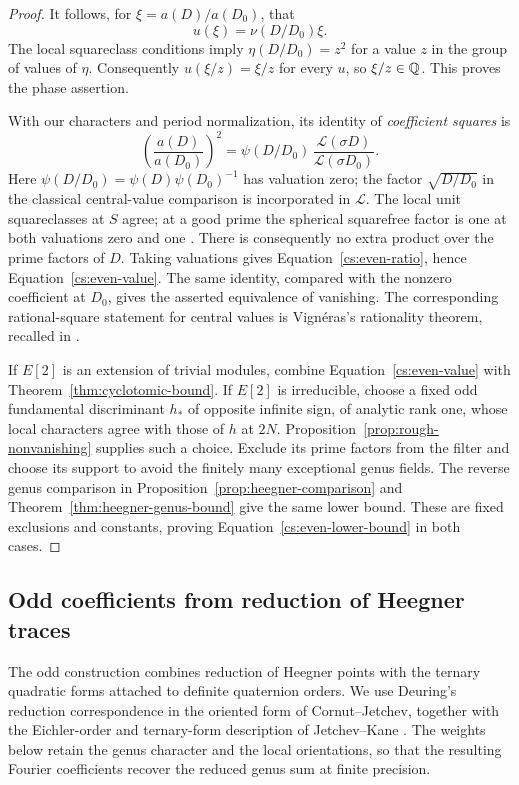 \begin{proof}
It follows, for $\xi=a(D)/a(D_0)$, that
\[
                         u(\xi)=\nu(D/D_0)\xi.
\]
The local squareclass conditions imply
$\eta(D/D_0)=z^2$ for a value $z$ in the group of values of $\eta$.
Consequently $u(\xi/z)=\xi/z$ for every $u$, so $\xi/z\in\mathbb Q$.
This proves the phase assertion.

With our characters and period normalization, its identity of
\emph{coefficient squares} is
\begin{equation}
 \left(\frac{a(D)}{a(D_0)}\right)^2
 =\psi(D/D_0)\,
   \frac{\mathcal L(\sigma D)}{\mathcal L(\sigma D_0)}.
 \label{cs:even-square-ratio}
\end{equation}
Here $\psi(D/D_0)=\psi(D)\psi(D_0)^{-1}$ has valuation zero;
the factor $\sqrt{D/D_0}$ in the classical central-value comparison
is incorporated in $\mathcal L$. The local unit
squareclasses at $S$ agree; at a good prime the spherical squarefree
factor is one at both valuations zero and one
\citep[Section~I.3, pp.~377--378]{Waldspurger1981}.
There is consequently no extra product over the prime factors of $D$.
Taking valuations gives Equation~\eqref{cs:even-ratio}, hence
Equation~\eqref{cs:even-value}. The same identity, compared with the
nonzero coefficient at $D_0$, gives the asserted equivalence of
vanishing. The corresponding rational-square statement for central values
is Vign\'eras's rationality theorem, recalled in
\citet[Section~6.3, Theorem~6]{Waldspurger1983}.

If $E[2]$ is an extension of trivial modules, combine
Equation~\eqref{cs:even-value} with
Theorem~\ref{thm:cyclotomic-bound}.
If $E[2]$ is irreducible, choose a fixed odd fundamental discriminant
$h_*$ of opposite infinite sign, of analytic rank one, whose local
characters agree with those of $h$ at $2N$.  Proposition~\ref{prop:rough-nonvanishing}
supplies such a choice.  Exclude its prime factors from the filter and
choose its support to avoid the finitely many exceptional genus fields.
The reverse genus comparison in Proposition~\ref{prop:heegner-comparison}
and Theorem~\ref{thm:heegner-genus-bound} give the same lower bound.
These are fixed exclusions and constants, proving
Equation~\eqref{cs:even-lower-bound} in both cases.
\end{proof}

\subsection{Odd coefficients from reduction of Heegner traces}

The odd construction combines reduction of Heegner points with the ternary
quadratic forms attached to definite quaternion orders. We use Deuring's
reduction correspondence in the oriented form of Cornut--Jetchev,
together with the Eichler-order and ternary-form description of
Jetchev--Kane \citep{Deuring1941,CornutJetchev2013,JetchevKane2011}.
The weights below retain the genus character and the local orientations,
so that the resulting Fourier coefficients recover the reduced genus sum
at finite precision.

